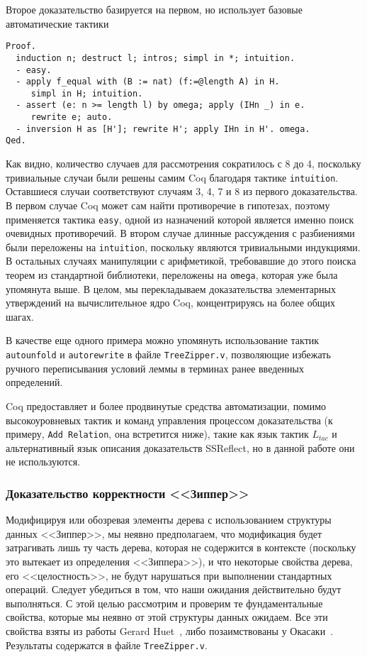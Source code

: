 Второе доказательство базируется на первом, но использует базовые автоматические тактики
\begin{Verbatim}[fontsize=\small]
Proof.
  induction n; destruct l; intros; simpl in *; intuition.
  - easy.
  - apply f_equal with (B := nat) (f:=@length A) in H.
     simpl in H; intuition.
  - assert (e: n >= length l) by omega; apply (IHn _) in e.
     rewrite e; auto.
  - inversion H as [H']; rewrite H'; apply IHn in H'. omega.
Qed.
\end{Verbatim}

Как видно, количество случаев для рассмотрения сократилось с 8 до 4, поскольку тривиальные случаи были решены самим Coq благодаря тактике \texttt{intuition}.  Оставшиеся случаи соответствуют случаям 3, 4, 7 и 8 из первого доказательства. В первом случае Coq может сам найти противоречие в гипотезах, поэтому применяется тактика \texttt{easy}, одной из назначений которой является именно поиск очевидных противоречий. В втором случае длинные рассуждения с разбиениями были переложены на \texttt{intuition}, поскольку являются тривиальными индукциями. В остальных случаях манипуляции с арифметикой, требовавшие до этого поиска теорем из стандартной библиотеки, переложены на \texttt{omega}, которая уже была упомянута выше. В целом, мы перекладываем доказательства элементарных утверждений на вычислительное ядро Coq, концентрируясь на более общих шагах.

В качестве еще одного примера можно упомянуть использование тактик \texttt{autounfold} и \texttt{autorewrite} в файле \texttt{TreeZipper.v}, позволяющие избежать ручного переписывания условий леммы в терминах ранее введенных определений.

Coq предоставляет и более продвинутые средства автоматизации, помимо высокоуровневых тактик и команд управления процессом доказательства (к примеру, \texttt{Add Relation}, она встретится ниже), такие как язык тактик $L_{tac}$ и альтернативный язык описания доказательств \textsf{SSReflect}, но в данной работе они не используются.

\subsubsection{Доказательство корректности <<Зиппер>>}

Модифицируя или обозревая элементы дерева с использованием структуры данных <<Зиппер>>, мы неявно предполагаем, что модификация будет затрагивать лишь ту часть дерева, которая не содержится в контексте (поскольку это вытекает из определения <<Зиппера>>), и что некоторые свойства дерева, его <<целостность>>, не будут нарушаться при выполнении стандартных операций. Следует убедиться в том, что наши ожидания действительно будут выполняться. С этой целью рассмотрим и проверим те фундаментальные свойства, которые мы неявно от этой структуры данных ожидаем. Все эти свойства взяты из работы Gerard Huet~\autocite{Huet1997}, либо позаимствованы у Окасаки~\autocite{Okasaki1996}. Результаты содержатся в файле \texttt{TreeZipper.v}.

